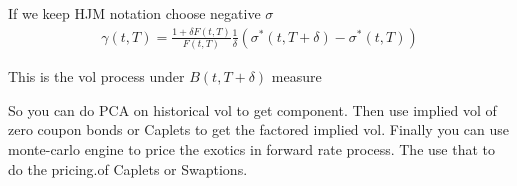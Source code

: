 {\color{blue}If we keep HJM notation choose negative $\sigma$}
\begin{equation}
\begin{aligned}
\gamma(t, T) = \frac{1 + \delta F(t, T) }{F(t, T)} \frac{1}{\delta} ( \sigma^\ast(t, T+\delta) -\sigma^\ast(t, T) )
\end{aligned}
\end{equation}

This is the vol process under $B(t, T + \delta)$ measure

So you can do PCA on historical vol to get component. Then use implied vol of zero coupon bonds or Caplets to get the factored implied vol. Finally you can use monte-carlo engine to price the exotics in forward rate process. The use that to do the pricing.of Caplets or Swaptions.
